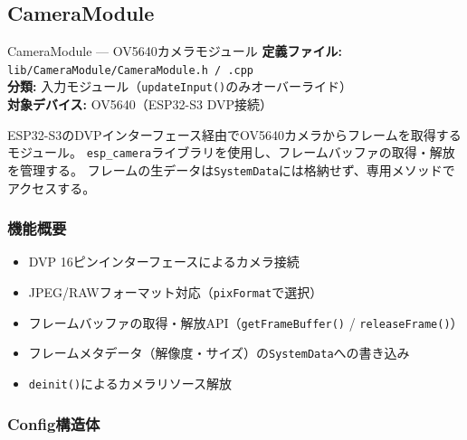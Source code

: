 \subsection{CameraModule}

\begin{apibox}{CameraModule --- OV5640カメラモジュール}
\textbf{定義ファイル:} \texttt{lib/CameraModule/CameraModule.h / .cpp}\\
\textbf{分類:} 入力モジュール（\texttt{updateInput()}のみオーバーライド）\\
\textbf{対象デバイス:} OV5640（ESP32-S3 DVP接続）

ESP32-S3のDVPインターフェース経由でOV5640カメラからフレームを取得するモジュール。
\texttt{esp\_camera}ライブラリを使用し、フレームバッファの取得・解放を管理する。
フレームの生データは\texttt{SystemData}には格納せず、専用メソッドでアクセスする。
\end{apibox}

\subsubsection{機能概要}

\begin{itemize}
    \item DVP 16ピンインターフェースによるカメラ接続
    \item JPEG/RAWフォーマット対応（\texttt{pixFormat}で選択）
    \item フレームバッファの取得・解放API（\texttt{getFrameBuffer()} / \texttt{releaseFrame()}）
    \item フレームメタデータ（解像度・サイズ）の\texttt{SystemData}への書き込み
    \item \texttt{deinit()}によるカメラリソース解放
\end{itemize}

\subsubsection{Config構造体}

